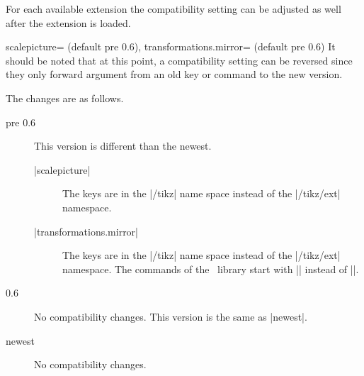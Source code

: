 \begin{multicols}{2}
\newcolumn
For each available extension the compatibility setting can be adjusted as well
after the extension is loaded.
\begin{keylist}{%
  scalepicture= (default pre 0.6),
  transformations.mirror= (default pre 0.6)}
  It should be noted that at this point, a compatibility setting can be reversed
  since they only forward argument from an old key or command to the new version.
  
  The changes are as follows.
  \begin{description}
  \item[pre 0.6] This version is different than the newest.
    \begin{description}
    \item[|scalepicture|] The keys are in the |/tikz| name space instead of the |/tikz/ext| namespace.
    \item[|transformations.mirror|]
      The keys are in the |/tikz| name space instead of the |/tikz/ext| namespace.
      The commands of the \pgfname\ library start with |\pgf| instead of |\pgfext|.
    \end{description}
  \item[0.6] No compatibility changes. This version is the same as |newest|.
  \item[newest] No compatibility changes.
  \end{description}
\end{keylist}
\end{multicols}